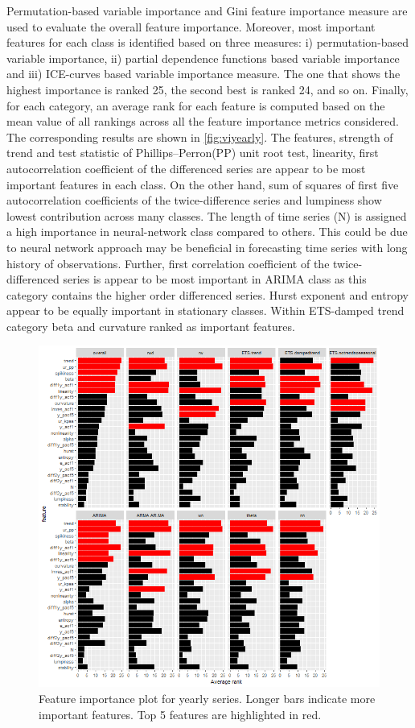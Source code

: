 \documentclass[11pt,a4paper,]{article}
\theoremstyle{definition}
\theoremstyle{definition}
\theoremstyle{definition}
\theoremstyle{remark}
\begin{document}
Permutation-based variable importance and Gini feature importance
measure are used to evaluate the overall feature importance. Moreover,
most important features for each class is identified based on three
measures: i) permutation-based variable importance, ii) partial
dependence functions based variable importance and iii) ICE-curves based
variable importance measure. The one that shows the highest importance
is ranked 25, the second best is ranked 24, and so on. Finally, for each
category, an average rank for each feature is computed based on the mean
value of all rankings across all the feature importance metrics
considered. The corresponding results are shown in
\autoref{fig:viyearly}. The features, strength of trend and test
statistic of Phillips--Perron(PP) unit root test, linearity, first
autocorrelation coefficient of the differenced series are appear to be
most important features in each class. On the other hand, sum of squares
of first five autocorrelation coefficients of the twice-difference
series and lumpiness show lowest contribution across many classes. The
length of time series (N) is assigned a high importance in
neural-network class compared to others. This could be due to neural
network approach may be beneficial in forecasting time series with long
history of observations. Further, first correlation coefficient of the
twice-differenced series is appear to be most important in ARIMA class
as this category contains the higher order differenced series. Hurst
exponent and entropy appear to be equally important in stationary
classes. Within ETS-damped trend category beta and curvature ranked as
important features.

\begin{figure}
\centering
\includegraphics{figures/viyearly-1.png}
\caption{\label{fig:viyearly}Feature importance plot for yearly series.
Longer bars indicate more important features. Top 5 features are
highlighted in red.}
\end{figure}
\end{document}
